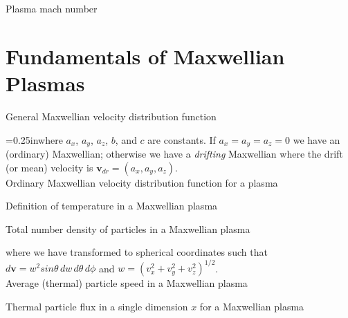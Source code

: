 \noindent
Plasma mach number 


\section{Fundamentals of Maxwellian Plasmas}

\noindent
General Maxwellian velocity distribution function 

\hangindent=0.25inwhere $a_x$, $a_y$, $a_z$, $b$, and $c$ are
constants.  If $a_x=a_y=a_z=0$ we have an (ordinary) Maxwellian;
otherwise we have a \textit{drifting} Maxwellian where the drift (or
mean) velocity is $\mathbf{v}_{dr}=(a_x,a_y,a_z)$.\\

\noindent
Ordinary Maxwellian velocity distribution function for a plasma 

\noindent
Definition of temperature in a Maxwellian plasma 

\noindent
Total number density of particles in a Maxwellian plasma 

\hangindent=0.25in where we have transformed to spherical coordinates
such that $d\mathbf{v} = w^2sin\theta\,dw\,d\theta\,d\phi$ and
$w=(v_x^2+v_y^2+v_z^2)^{1/2}$.\\

\noindent
Average (thermal) particle speed in a Maxwellian plasma 

\noindent
Thermal particle flux in a single dimension $x$ for a Maxwellian plasma 

